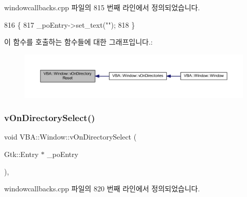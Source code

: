 windowcallbacks.\+cpp 파일의 815 번째 라인에서 정의되었습니다.


\begin{DoxyCode}
816 \{
817   \_poEntry->set\_text(\textcolor{stringliteral}{""});
818 \}
\end{DoxyCode}
이 함수를 호출하는 함수들에 대한 그래프입니다.\+:
\nopagebreak
\begin{figure}[H]
\begin{center}
\leavevmode
\includegraphics[width=350pt]{class_v_b_a_1_1_window_aedc6f08a9c1f1a54ec41347f96dfd213_icgraph}
\end{center}
\end{figure}
\mbox{\label{class_v_b_a_1_1_window_ab2aa067d967ea52a685574fc09c11f33}} 
\subsubsection{\texorpdfstring{v\+On\+Directory\+Select()}{vOnDirectorySelect()}}
{\footnotesize\ttfamily void V\+B\+A\+::\+Window\+::v\+On\+Directory\+Select (\begin{DoxyParamCaption}\item[{Gtk\+::\+Entry $\ast$}]{\+\_\+po\+Entry }\end{DoxyParamCaption})\hspace{0.3cm}{\ttfamily [protected]}, {\ttfamily [virtual]}}



windowcallbacks.\+cpp 파일의 820 번째 라인에서 정의되었습니다.


